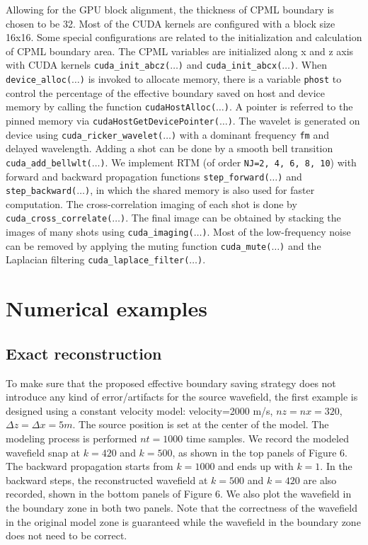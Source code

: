 Allowing for the GPU block alignment, the thickness of CPML boundary is chosen to be 32. Most of the CUDA kernels are configured with a block size 16x16. Some special configurations are related to the initialization and calculation of CPML boundary area. The CPML variables are initialized along x and z axis with CUDA kernels \texttt{cuda\_init\_abcz($\ldots$)} and \texttt{cuda\_init\_abcx($\ldots$)}. When \texttt{device\_alloc($\ldots$)} is invoked to allocate memory, there is a variable \texttt{phost} to control the percentage of the effective boundary saved on host and device memory by calling the function \texttt{cudaHostAlloc($\ldots$)}. A pointer is referred to the pinned memory via \texttt{cudaHostGetDevicePointer($\ldots$)}. The wavelet is generated on device using \texttt{cuda\_ricker\_wavelet($\ldots$)} with a dominant frequency \texttt{fm} and delayed wavelength. Adding a shot can be done by a smooth bell transition \texttt{cuda\_add\_bellwlt($\ldots$)}. We implement RTM (of order \texttt{NJ=2, 4, 6, 8, 10}) with forward and backward propagation functions \texttt{step\_forward($\ldots$)} and \texttt{step\_backward($\ldots$)}, in which the shared memory is also used for faster computation. The cross-correlation imaging of each shot is done by \texttt{cuda\_cross\_correlate($\ldots$)}. The final image can be obtained by stacking the images of many shots using \texttt{cuda\_imaging($\ldots$)}. Most of the low-frequency noise can be removed by applying the muting function \texttt{cuda\_mute($\ldots$)}  and the Laplacian filtering \texttt{cuda\_laplace\_filter($\ldots$)}.



\section{Numerical examples}

\subsection{Exact reconstruction}

To make sure that the proposed effective boundary saving strategy does not introduce any kind of error/artifacts for the source wavefield,  the first example is designed using a constant velocity model: velocity=2000 m/s, $nz=nx=320$, $\Delta z=\Delta x=5m$. The source position is set at the center of the model. The modeling process is performed $nt=1000$ time samples. We record the modeled wavefield snap at $k=420$ and $k=500$, as shown in the top panels of Figure 6. The backward propagation starts from $k=1000$ and ends up with $k=1$. In the backward steps, the reconstructed wavefield at $k=500$ and $k=420$ are also recorded, shown in the bottom panels of Figure 6. We also plot the wavefield in the boundary zone in both two panels. Note that the correctness of the wavefield in the original model zone is guaranteed while the wavefield in the boundary zone does not need to be correct.

